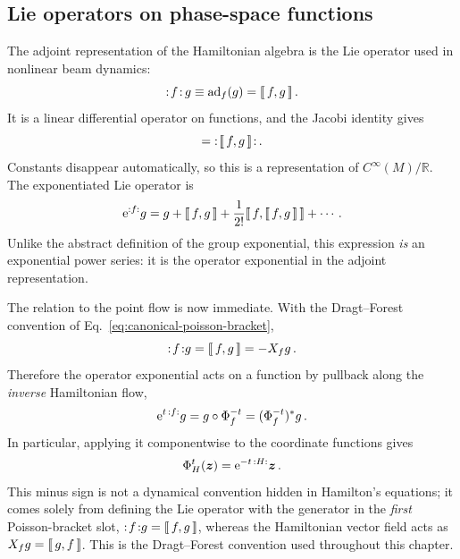 \subsection{Lie operators on phase-space functions}

The adjoint representation of the Hamiltonian algebra is the Lie operator
used in nonlinear beam dynamics:
\begin{equation}\label{eq:colon-definition}
    {\ensuremath{:\!{f}\!:}} \,g \equiv \operatorname{ad}_f(g) = \llbracket \, f,g\,\rrbracket\,.
\end{equation}
It is a linear differential operator on functions, and the Jacobi identity
gives
\begin{equation}
    [\Lie{f},\Lie{g}] = \Lie{\poisson{f}{g}}\,.
\end{equation}
Constants disappear automatically, so this is a representation of
$C^\infty(M)/\mathbb{R}$.  The exponentiated Lie operator is
\begin{equation}\label{eq:lie-exponential}
    \mathrm{e}^{{:{f}:}} g = g + \llbracket \, f,g\,\rrbracket
    + \frac{1}{2!}\llbracket \, f,\llbracket \, f,g\,\rrbracket\,\rrbracket + \cdots\,.
\end{equation}
Unlike the abstract definition of the group exponential, this expression
\emph{is} an exponential power series: it is the operator exponential in the
adjoint representation.

The relation to the point flow is now immediate.  With the Dragt--Forest
convention of Eq.~\eqref{eq:canonical-poisson-bracket},
\begin{equation}
    {\ensuremath{:\!{f}\!:}}g = \llbracket \, f,g\,\rrbracket = -X_fg\,.
\end{equation}
Therefore the operator exponential acts on a function by pullback along the
\emph{inverse} Hamiltonian flow,
\begin{equation}\label{eq:lie-flow-relation}
    \mathrm{e}^{t\,{:{f}:}}g = g\circ\Phi_f^{-t} = (\Phi_f^{-t})^*g\,.
\end{equation}
In particular, applying it componentwise to the coordinate functions gives
\begin{equation}
    \Phi_H^t(\bm{z}) = \mathrm{e}^{-t\,{:{H}:}}\bm{z}\,.
\end{equation}
This minus sign is not a dynamical convention hidden in Hamilton's equations;
it comes solely from defining the Lie operator with the generator in the
\emph{first} Poisson-bracket slot, ${:\!{f}\!:}g = \llbracket \, f,g\,\rrbracket$, whereas the
Hamiltonian vector field acts as $X_fg = \llbracket \, g,f\,\rrbracket$.  This is the
Dragt--Forest convention used throughout this chapter.

